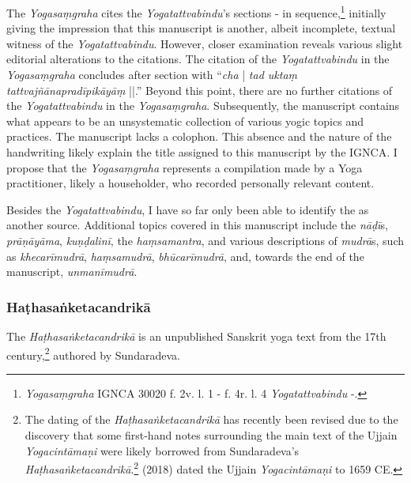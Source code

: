 The \emph{Yogasaṃgraha} cites the \emph{Yogatattvabindu}'s sections - in sequence,\footnote{\emph{Yogasaṃgraha} IGNCA 30020 f. 2v. l. 1 - f. 4r. l. 4 \approx  \emph{Yogatattvabindu} -.} initially giving the impression that this manuscript is another, albeit incomplete, textual witness of the \emph{Yogatattvabindu}. However, closer examination reveals various slight editorial alterations to the citations. The citation of the \emph{Yogatattvabindu} in the \emph{Yogasaṃgraha} concludes after section  with ``\textit{cha} | \textit{tad uktaṃ tattvajñānapradīpikāyāṃ} ||.'' Beyond this point, there are no further citations of the \emph{Yogatattvabindu} in the \emph{Yogasaṃgraha}. Subsequently, the manuscript contains what appears to be an unsystematic collection of various yogic topics and practices. The manuscript lacks a colophon. This absence and the nature of the handwriting likely explain the title assigned to this manuscript by the IGNCA. I propose that the \emph{Yogasaṃgraha} represents a compilation made by a Yoga practitioner, likely a householder, who recorded personally relevant content.

Besides the \emph{Yogatattvabindu}, I have so far only been able to identify the \nocite{uttaragita1926} as another source. Additional topics covered in this manuscript include the \textit{nāḍī}s, \textit{prāṇāyāma}, \textit{kuṇḍalinī}, the \emph{haṃsamantra}, and various descriptions of \emph{mudrā}s, such as \textit{khecarīmudrā}, \textit{haṃsamudrā}, \textit{bhūcarīmudrā}, and, towards the end of the manuscript, \textit{unmanīmudrā}.   

\subsubsection{Haṭhasaṅketacandrikā}
\label{hathacandrika}

The \emph{Haṭhasaṅketacandrikā} is an unpublished Sanskrit yoga text from the 17th century,\footnote{The dating of the \textit{Haṭhasaṅketacandrikā} has recently been revised due to the discovery that some first-hand notes surrounding the main text of the Ujjain \textit{Yogacintāmaṇi} were likely borrowed from Sundaradeva's \textit{Haṭhasaṅketacandrikā}.\footnote{Cf. \citeauthor[2024: 52-54]{birch2024}.} \citeauthor{birch2018proliferation} (2018) dated the Ujjain \textit{Yogacintāmaṇi} to 1659 CE.} authored by Sundaradeva.

